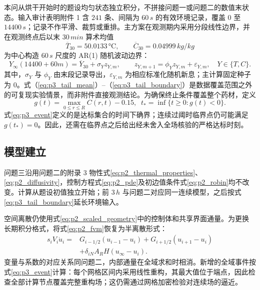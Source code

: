 \documentclass[withoutpreface,bwprint]{cumcmthesis}
\begin{document}
本问从烘干开始时的题设均匀状态独立积分，不拼接问题一或问题二的数值末状态。输入审计表明附件 1 含 $241$ 条、间隔为 $60\,\si{s}$ 的有效环境记录，覆盖 $0$ 至 $14400\,\si{s}$；记录不作平滑、裁剪或重排。主方案在观测期内采用分段线性边界，并在观测终点后以末 $30\,\si{min}$ 算术均值
\begin{equation}
\overline T_{30}=50.0133\,\si{\celsius},\qquad
\overline C_{30}=0.04999\,\si{kg/kg}
\label{eq:p3_tail_mean}
\end{equation}
为中心构造 $60\,\si{s}$ 尺度的 AR(1) 随机波动边界：
\begin{equation}
Y_\infty(14400+60m)=\overline Y_{30}+\sigma_Y z_{Y,m},\qquad
z_{Y,m+1}=\phi_Y z_{Y,m}+\varepsilon_{Y,m},\quad Y\in\{T,C\}.
\label{eq:p3_tail_boundary}
\end{equation}
其中，$\sigma_Y$ 与 $\phi_Y$ 由末段记录导出，$\varepsilon_{Y,m}$ 为相应标准化随机新息；主计算固定种子为 $0$。式（\ref{eq:p3_tail_mean}）--（\ref{eq:p3_tail_boundary}）是数据覆盖范围之外的可复现实验情景，而非附件直接观测结论。为确保终止条件覆盖整个药材，定义
\begin{equation}
g(t)=\max_{0\leq r\leq R}C(r,t)-0.15,\;\;
t_* =\inf\{t\geq0:g(t)<0\}.
\label{eq:p3_event}
\end{equation}
式\eqref{eq:p3_event}定义的是达标集合的时间下确界；连续过阈时临界点仍可能满足 $g(t_*)=0$。因此，还需在临界点之后给出经未舍入全场核验的严格达标时刻。

\subsection{模型建立}

问题三沿用问题二的附录 3 物性式\eqref{eq:p2_thermal_properties}、\eqref{eq:p2_diffusivity}，控制方程式\eqref{eq:p2_pde}及初边值条件式\eqref{eq:p2_robin}均不改变。计算从题设初值独立开始；前 $3\,\si{h}$ 与问题二对应同一连续模型，之后按式\eqref{eq:p3_tail_boundary}延长环境输入。

空间离散仍使用式\eqref{eq:p2_scaled_geometry}中的控制体和共享界面通量。为更换长期积分格式，将式\eqref{eq:p2_fvm}恢复为半离散形式：
\begin{equation}
\begin{aligned}
s_iV_i\dot u_i={}&G_{i-1/2}(u_{i-1}-u_i)+G_{i+1/2}(u_{i+1}-u_i)\\
&+\delta_{iN}A_RH(u_\infty-u_i).
\end{aligned}
\label{eq:p3_semidiscrete_fvm}
\end{equation}
变量与系数的对应关系同问题二，内部通量在全域求和时相消。新增的全域事件按式\eqref{eq:p3_event}计算：每个网格区间内采用线性重构，其最大值位于端点，因此检查全部计算节点覆盖完整重构场；这仍需通过网格加密检验对连续场的逼近。
\end{document}
